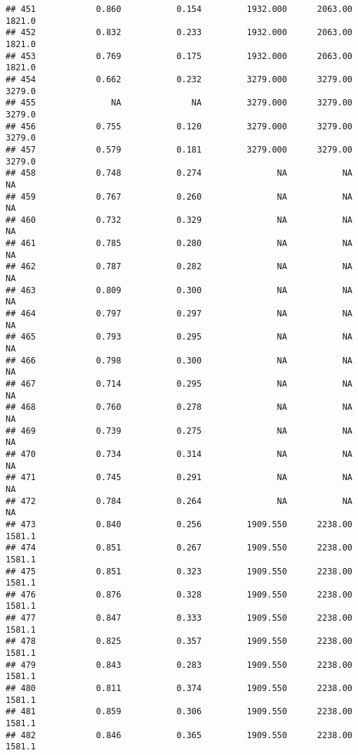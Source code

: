 \documentclass[
]{article}
\begin{document}
\begin{verbatim}
## 451            0.860           0.154         1932.000      2063.00       1821.0
## 452            0.832           0.233         1932.000      2063.00       1821.0
## 453            0.769           0.175         1932.000      2063.00       1821.0
## 454            0.662           0.232         3279.000      3279.00       3279.0
## 455               NA              NA         3279.000      3279.00       3279.0
## 456            0.755           0.120         3279.000      3279.00       3279.0
## 457            0.579           0.181         3279.000      3279.00       3279.0
## 458            0.748           0.274               NA           NA           NA
## 459            0.767           0.260               NA           NA           NA
## 460            0.732           0.329               NA           NA           NA
## 461            0.785           0.280               NA           NA           NA
## 462            0.787           0.282               NA           NA           NA
## 463            0.809           0.300               NA           NA           NA
## 464            0.797           0.297               NA           NA           NA
## 465            0.793           0.295               NA           NA           NA
## 466            0.798           0.300               NA           NA           NA
## 467            0.714           0.295               NA           NA           NA
## 468            0.760           0.278               NA           NA           NA
## 469            0.739           0.275               NA           NA           NA
## 470            0.734           0.314               NA           NA           NA
## 471            0.745           0.291               NA           NA           NA
## 472            0.784           0.264               NA           NA           NA
## 473            0.840           0.256         1909.550      2238.00       1581.1
## 474            0.851           0.267         1909.550      2238.00       1581.1
## 475            0.851           0.323         1909.550      2238.00       1581.1
## 476            0.876           0.328         1909.550      2238.00       1581.1
## 477            0.847           0.333         1909.550      2238.00       1581.1
## 478            0.825           0.357         1909.550      2238.00       1581.1
## 479            0.843           0.283         1909.550      2238.00       1581.1
## 480            0.811           0.374         1909.550      2238.00       1581.1
## 481            0.859           0.306         1909.550      2238.00       1581.1
## 482            0.846           0.365         1909.550      2238.00       1581.1

\end{verbatim}
\end{document}

